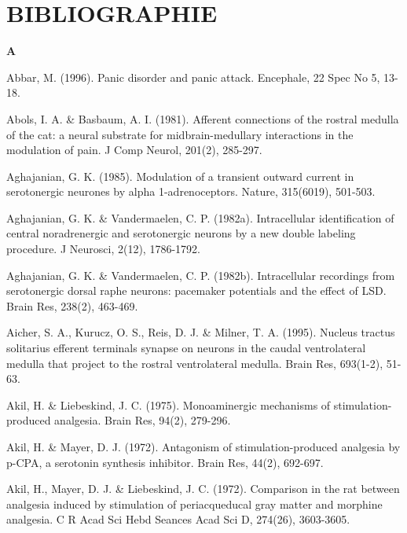 \documentclass[a4paper,12pt,twoside]{report}
\begin{document}
\part{BIBLIOGRAPHIE}

\setlength{\parindent}{-0.3cm}
\setlength{\columnsep}{1cm}

\twocolumn

\begin{singlespacing}
\begin{footnotesize}

\medskip 
\begin{Large}\textbf{A}\end{Large}

Abbar, M. (1996). Panic disorder and panic attack. Encephale, 22 Spec No 5, 13-18.

Abols, I. A. \& Basbaum, A. I. (1981). Afferent connections of the rostral medulla of the cat: a neural substrate for midbrain-medullary interactions in the modulation of pain. J Comp Neurol, 201(2), 285-297.

Aghajanian, G. K. (1985). Modulation of a transient outward current in serotonergic neurones by \linebreak alpha 1-adrenoceptors. Nature, 315(6019), 501-503.

Aghajanian, G. K. \& Vandermaelen, C. P. (1982a). Intracellular identification of central noradrenergic and serotonergic neurons by a new double labeling procedure. J Neurosci, 2(12), 1786-1792.

Aghajanian, G. K. \& Vandermaelen, C. P. (1982b). Intracellular recordings from serotonergic dorsal raphe neurons: pacemaker potentials and the effect of LSD. Brain Res, 238(2), 463-469.

Aicher, S. A., Kurucz, O. S., Reis, D. J. \& Milner, T. A. (1995). Nucleus tractus solitarius efferent terminals synapse on neurons in the caudal ventrolateral medulla that project to the rostral ventrolateral medulla. Brain Res, 693(1-2), 51-63.

Akil, H. \& Liebeskind, J. C. (1975). Monoaminergic mechanisms of stimulation-produced analgesia. Brain Res, 94(2), 279-296.

Akil, H. \& Mayer, D. J. (1972). Antagonism of stimulation-produced analgesia by p-CPA, a serotonin synthesis inhibitor. Brain Res, 44(2), 692-697.

Akil, H., Mayer, D. J. \& Liebeskind, J. C. (1972). Comparison in the rat between analgesia induced by stimulation of periacqueducal gray matter and morphine analgesia. C R Acad Sci Hebd Seances Acad Sci D, 274(26), 3603-3605.


\end{footnotesize}
\end{singlespacing}
\end{document}
